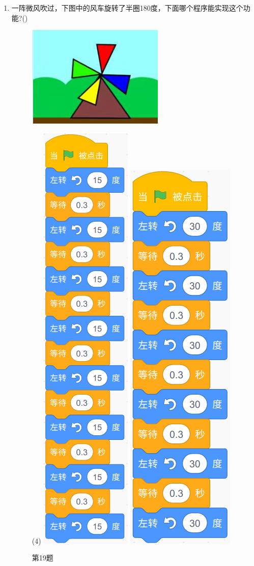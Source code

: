 \documentclass[10pt, a4paper]{article}
\begin{document}
\begin{enumerate}
        \item  一阵微风吹过，下图中的风车旋转了半圈180度，下面哪个程序能实现这个功能?(\qquad)
        \begin{figure}[htbp]
            \centering
            \begin{minipage}{.28\textwidth}
                \centering
                \includegraphics[width=\textwidth]{19.jpg}
                \caption*{第19题}
            \end{minipage}
            \begin{minipage}{.68\textwidth}
                \centering
                \begin{tasks}(4)
                    \task \includegraphics[width=.1\textwidth]{19a.png}
                    \task \includegraphics[width=.12\textwidth]{19b.png}

\end{tasks}
\end{minipage}
\end{figure}
\end{enumerate}
\end{document}
